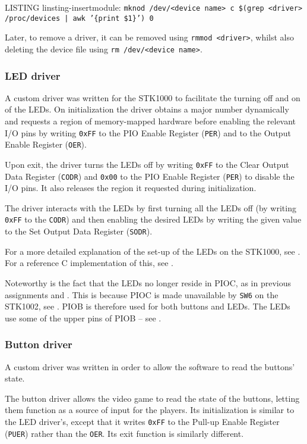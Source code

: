 LISTING linsting-insertmodule: \texttt{mknod /dev/<device name> c \$(grep <driver> /proc/devices | awk '\{print \$1\}') 0}

Later, to remove a driver, it can be removed using \texttt{rmmod <driver>}, whilst also deleting the device file using \texttt{rm /dev/<device name>}.

\subsubsection{LED driver}
A custom driver was written for the STK1000 to facilitate the turning off and on of the LEDs.
On initialization the driver obtains a major number dynamically and requests a region of memory-mapped hardware before enabling the relevant I/O pins by writing \texttt{0xFF} to the PIO Enable Register (\texttt{PER}) and to the Output Enable Register (\texttt{OER}).

Upon exit, the driver turns the LEDs off by writing \texttt{0xFF} to the Clear Output Data Register (\texttt{CODR}) and \texttt{0x00} to the PIO Enable Register (\texttt{PER}) to disable the I/O pins.
It also releases the region it requested during initialization.

The driver interacts with the LEDs by first turning all the LEDs off (by writing \texttt{0xFF} to the \texttt{CODR}) and then enabling the desired LEDs by writing the given value to the Set Output Data Register (\texttt{SODR}).

For a more detailed explanation of the set-up of the LEDs on the STK1000, see \cite{tdt4258-1}.
For a reference C implementation of this, see \cite{tdt4258-2}.

Noteworthy is the fact that the LEDs no longer reside in PIOC, as in previous assignments \cite{tdt4258-1} and \cite{tdt4258-2}.
This is because PIOC is made unavailable by \texttt{SW6} on the STK1002, see \cite{lab-compendium}.
PIOB is therefore used for both buttons and LEDs.
The LEDs use some of the upper pins of PIOB -- see \cite{lab-compendium}.

\subsubsection{Button driver}
A custom driver was written in order to allow the software to read the buttons' state.

The button driver allows the video game to read the state of the buttons, letting them function as a source of input for the players.
Its initialization is similar to the LED driver's, except that it writes \texttt{0xFF} to the Pull-up Enable Register (\texttt{PUER}) rather than the \texttt{OER}.
Its exit function is similarly different.

